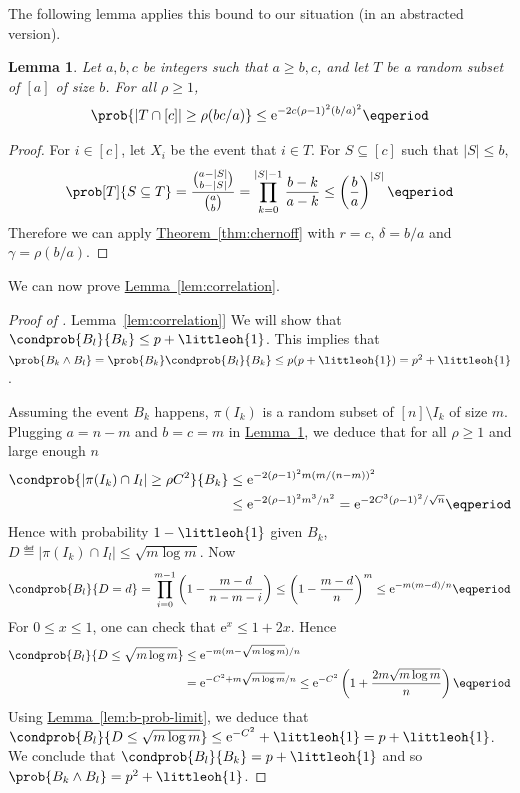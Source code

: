 \documentclass[11pt]{article}
\numberwithin{equation}{section}
\newtheorem{lemma}[theorem]{Lemma}
\theoremstyle{definition}
\theoremstyle{plain}
\newcommand{\eee}{\mathrm e}
\newcommand{\expref}[2]{\hyperref[#2]{#1~\ref{#2}}}
\begin{document}
%

The following lemma applies this bound to our situation (in an abstracted version).

\begin{lemma} \label{lem:prob-est}
 Let $a,b,c$ be integers such that $a \geq b,c$, and let $T$ be a random subset of $[a]$ of size $b$. For all $\rho \geq 1$,
 \begin{equation*}
  \prob{|T \cap [c]| \geq \rho (bc/a)} \leq \eee^{-2c(\rho-1)^2(b/a)^2} \eqperiod
 \end{equation*}
\end{lemma}
\begin{proof}
 For $i \in [c]$, let $X_i$ be the event that $i \in T$. For $S \subseteq [c]$ such that $|S| \leq b$,
\begin{equation}
 \prob[T]{S \subseteq T} = \frac{\binom{a-|S|}{b-|S|}}{\binom{a}{b}} =
 \prod_{k=0}^{|S|-1} \frac{b-k}{a-k} \leq \left(\frac{b}{a}\right)^{|S|} \eqperiod
\end{equation}
 Therefore we can apply \expref{Theorem}{thm:chernoff} with $r = c$, $\delta = b/a$ and $\gamma = \rho(b/a)$.
\end{proof}

We can now prove \expref{Lemma}{lem:correlation}.

\begin{proof}[Proof of \expref{Lemma}{lem:correlation}]
 We will show that $\condprob{B_l}{B_k} \leq p + \littleoh{1}$. This implies that $\prob{B_k \land B_l} = \prob{B_k} \condprob{B_l}{B_k} \leq p(p + \littleoh{1}) = p^2 + \littleoh{1}$.

 Assuming the event $B_k$ happens, $\pi(I_k)$ is a random subset of $[n] \setminus I_k$ of size $m$. Plugging $a = n-m$ and $b = c = m$ in \expref{Lemma}{lem:prob-est}, we deduce that for all $\rho \geq 1$ and large enough $n$
 \begin{align}
  \condprob{|\pi(I_k) \cap I_l| \geq \rho C^2}{B_k} &\leq \eee^{-2(\rho-1)^2m(m/(n-m))^2} \\&\leq \eee^{-2(\rho-1)^2 m^3/n^2} = \eee^{-2C^3(\rho-1)^2/\sqrt{n}} \eqperiod
 \end{align}
 Hence with probability $1-\littleoh{1}$ given $B_k$, $D \eqdef |\pi(I_k) \cap I_l| \leq \sqrt{m\log m}$. Now
\begin{equation}
 \condprob{B_l}{D=d} = \prod_{i=0}^{m-1} \left(1 - \frac{m-d}{n-m-i}\right) \leq \left(1 - \frac{m-d}{n}\right)^m \leq \eee^{-m(m-d)/n} \eqperiod
\end{equation}
%
%
 For $0 \leq x \leq 1$, one can check that $\eee^x \leq 1 + 2x$. Hence
\begin{align}
 \condprob{B_l}{D \leq \sqrt{m\log m}} &\leq \eee^{-m(m-\sqrt{m\log m})/n} \\ &= \eee^{-C^2+m\sqrt{m\log m}/n} \leq \eee^{-C^2} \left(1 + \frac{2m\sqrt{m\log m}}{n}\right) \eqperiod
\end{align}
 Using \expref{Lemma}{lem:b-prob-limit}, we deduce that $\condprob{B_l}{D \leq \sqrt{m\log m}} \leq \eee^{-C^2} + \littleoh{1} = p + \littleoh{1}$.
 We conclude that $\condprob{B_l}{B_k} = p + \littleoh{1}$ and so $\prob{B_k \land B_l} = p^2 + \littleoh{1}$.
\end{proof}
\end{document}

